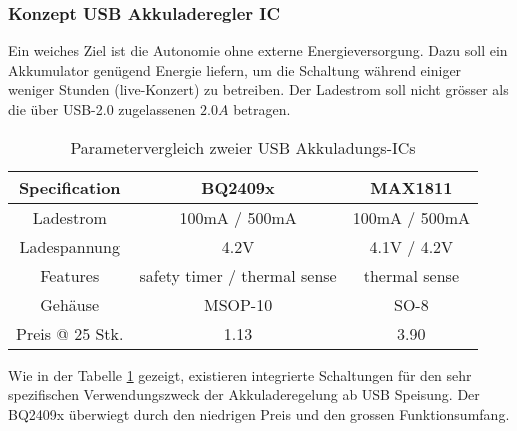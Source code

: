 \subsubsection{Konzept USB Akkuladeregler IC}
\label{sec:Konzept_Charger}

Ein weiches Ziel ist die Autonomie ohne externe Energieversorgung. 
Dazu soll ein Akkumulator genügend Energie liefern, um die Schaltung während einiger weniger Stunden (live-Konzert) zu betreiben. 
Der Ladestrom soll nicht grösser als die über USB-2.0 zugelassenen $2.0\si{A}$ betragen.

\begin{table}[H]
	\centering
	\begin{tabular}{|c|c|c|}
		\hline
		\textbf{Specification} & \textbf{BQ2409x}             & \textbf{MAX1811} \\ \hline
		Ladestrom              & 100mA / 500mA                & 100mA / 500mA    \\ \hline
		Ladespannung           & 4.2V                         & 4.1V / 4.2V      \\ \hline
		Features               & safety timer / thermal sense & thermal sense    \\ \hline
		Gehäuse                & MSOP-10                      & SO-8             \\ \hline
		Preis @ 25 Stk.        & 1.13                         & 3.90             \\ \hline
	\end{tabular}
	\caption{Parametervergleich zweier USB Akkuladungs-ICs}
	\label{tab:ComparisonCharger}
\end{table}

Wie in der Tabelle \ref{tab:ComparisonCharger} gezeigt, existieren integrierte Schaltungen für den sehr spezifischen Verwendungszweck der Akkuladeregelung ab USB Speisung.
Der BQ2409x überwiegt durch den niedrigen Preis und den grossen Funktionsumfang.
